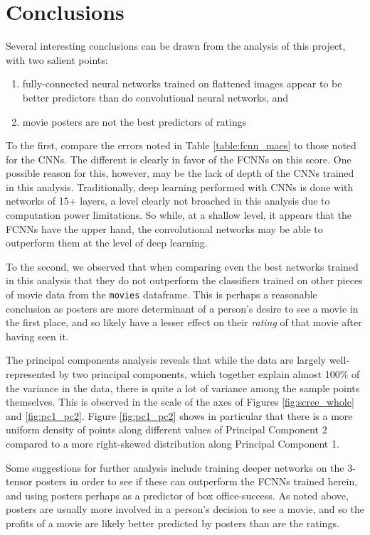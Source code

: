 \documentclass[12pt, oneside]{article}   	%
\begin{document}
\section{Conclusions}

Several interesting conclusions can be drawn from the analysis of this project, with two salient points:
\begin{enumerate}
\item fully-connected neural networks trained on flattened images appear to be better predictors than do convolutional neural networks, and
\item movie posters are not the best predictors of ratings
\end{enumerate}

To the first, compare the errors noted in Table \ref{table:fcnn_maes} to those noted for the CNNs. The different is clearly in favor of the FCNNs on this score. One possible reason for this, however, may be the lack of depth of the CNNs trained in this analysis. Traditionally, deep learning performed with CNNs is done with networks of 15+ layers, a level clearly not broached in this analysis due to computation power limitations. So while, at a shallow level, it appears that the FCNNs have the upper hand, the convolutional networks may be able to outperform them at the level of deep learning.

To the second, we observed that when comparing even the best networks trained in this analysis that they do not outperform the classifiers trained on other pieces of movie data from the \texttt{movies} dataframe. This is perhaps a reasonable conclusion as posters are more determinant of a person's desire to see a movie in the first place, and so likely have a lesser effect on their \textit{rating} of that movie after having seen it. 

The principal components analysis reveals that while the data are largely well-represented by two principal components, which together explain almost 100\% of the variance in the data, there is quite a lot of variance among the sample points themselves. This is observed in the scale of the axes of Figures \ref{fig:scree_whole} and \ref{fig:pc1_pc2}. Figure \ref{fig:pc1_pc2} shows in particular that there is a more uniform density of points along different values of Principal Component 2 compared to a more right-skewed distribution along Principal Component 1.

Some suggestions for further analysis include training deeper networks on the 3-tensor posters in order to see if these can outperform the FCNNs trained herein, and using posters perhaps as a predictor of box office-success. As noted above, posters are usually more involved in a person's decision to see a movie, and so the profits of a movie are likely better predicted by posters than are the ratings.
\end{document}
